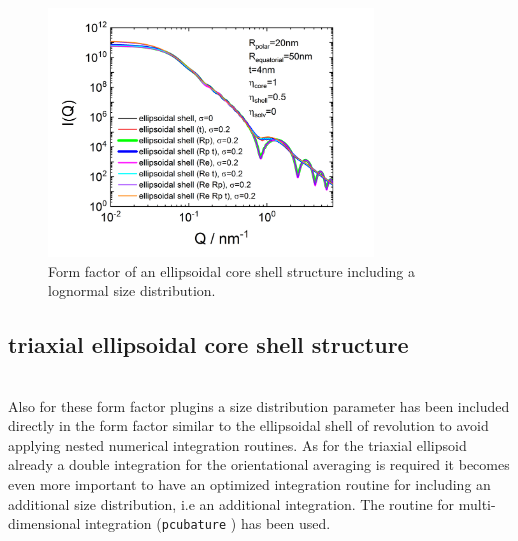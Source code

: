\begin{figure}[htb]
\begin{center}
\includegraphics[width=0.768\textwidth]{../images/form_factor/Ellipsoid/spheroid_core_shell.png}
\end{center}
\caption{Form factor of an ellipsoidal core shell structure including a lognormal size distribution.} \label{fig:I_ellipsoidal_core_shell}
\end{figure}

\clearpage
\subsection{triaxial ellipsoidal core shell structure}
\label{sect:triaxEllShell1} ~\\
Also for these form factor plugins a size distribution parameter has been included directly in the form factor similar to the ellipsoidal shell of revolution to avoid applying nested numerical integration routines. As for the triaxial ellipsoid already a double integration for the orientational averaging is required it becomes even more important to have an optimized integration routine for including an additional size distribution, i.e an additional integration. The routine for multi-dimensional integration  (\texttt{pcubature} \cite{Johnson}) has been used.

